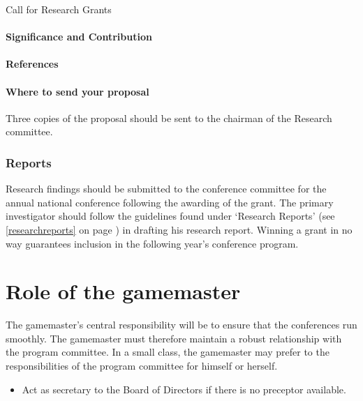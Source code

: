 \begin{refsection}
\begin{apatextbox}{Call for Research Grants}
\paragraph{Significance and Contribution}
\label{significanceandcontribution}

\paragraph{References}
\label{references}

\paragraph{Where to send your proposal}
\label{wheretosendyourproposal}

Three copies of the proposal should be sent to the chairman of the Research committee.

\subsubsection{Reports}
\label{reports}

Research findings should be submitted to the conference committee for the annual national conference following the awarding of the grant. The primary investigator should follow the guidelines found under `Research Reports' (see \ref{researchreports} on page \pageref{researchreports}) in drafting his research report. Winning a grant in no way guarantees inclusion in the following year's conference program.

\end{apatextbox}

\section{Role of the gamemaster}
\label{roleofthegamemaster}

The gamemaster's central responsibility will be to ensure that the conferences run smoothly. The gamemaster must therefore maintain a robust relationship with the program committee. In a small class, the gamemaster may prefer to the responsibilities of the program committee for himself or herself.

\begin{itemize}
\item Act as secretary to the Board of Directors if there is no preceptor available.


\end{itemize}
\end{refsection}
